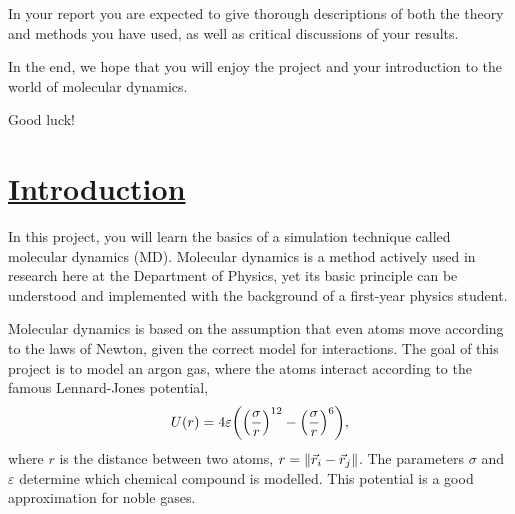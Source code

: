 \documentclass[11pt,british,a4paper]{report}
\begin{document}
In your report you are expected to give thorough descriptions of both the theory and methods you have used, as well as critical discussions of your results.

In the end, we hope that you will enjoy the project and your introduction to the world of molecular dynamics. 

Good luck!


\clearpage

\section{\underline{Introduction}}
In this project, you will learn the basics of a simulation technique called molecular dynamics (MD). Molecular dynamics is a method actively used in research here at the Department of Physics, yet its basic principle can be understood and implemented with the background of a first-year physics student.

Molecular dynamics is based on the assumption that even atoms move according to the laws of Newton, given the correct model for interactions. The goal of this project is to model an argon gas, where the atoms interact according to the famous Lennard-Jones potential,
\begin{equation}
    U(r) = 4\varepsilon\qty(\qty(\frac{\sigma}{r})^{12} - \qty(\frac{\sigma}{r})^6), \label{eq:lj}
\end{equation}
where \(r\) is the distance between two atoms, \(r=\norm{\vec{r}_i-\vec{r}_j}\). The parameters \(\sigma\) and \(\varepsilon\) determine which chemical compound is modelled. This potential is a good approximation for noble gases.
\end{document}
